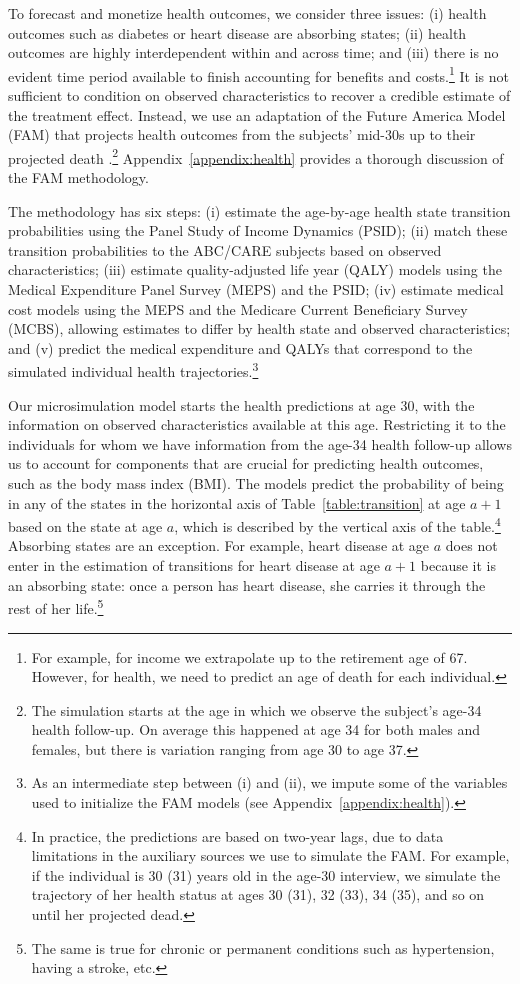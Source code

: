To forecast and monetize health outcomes, we consider three issues: (i) health outcomes such as diabetes or heart disease are absorbing states; (ii) health outcomes are highly interdependent within and across time; and (iii) there is no evident time period available to finish accounting for benefits and costs.\footnote{For example, for income we extrapolate up to the retirement age of 67. However, for health, we need to predict an age of death for each individual.} It is not sufficient to condition on observed characteristics to recover a credible estimate of the treatment effect. Instead, we use an adaptation of the Future America Model (FAM) that projects health outcomes from the subjects' mid-30s up to their projected death \citep{Goldman_etal_2015_Future-Elderly-Model-Report}.\footnote{The simulation starts at the age in which we observe the subject's age-34 health follow-up. On average this happened at age 34 for both males and females, but there is variation ranging from age 30 to age 37.} Appendix~\ref{appendix:health} provides a thorough discussion of the FAM methodology.

 The methodology has six steps: (i) estimate the age-by-age health state transition probabilities using the Panel Study of Income Dynamics (PSID); (ii) match these transition probabilities to the ABC/CARE subjects based on observed characteristics; (iii) estimate quality-adjusted life year (QALY) models using the Medical Expenditure Panel Survey (MEPS) and the PSID; (iv) estimate medical cost models using the MEPS and the Medicare Current Beneficiary Survey (MCBS), allowing estimates to differ by health state and observed characteristics; and (v) predict the medical expenditure and QALYs that correspond to the simulated individual health trajectories.\footnote{As an intermediate step between (i) and (ii), we impute some of the variables used to initialize the FAM models (see Appendix~\ref{appendix:health}).}

Our microsimulation model starts the health predictions at age 30, with the information on observed characteristics available at this age. Restricting it to the individuals for whom we have information from the age-34 health follow-up allows us to account for components that are crucial for predicting health outcomes, such as the body mass index (BMI). The models predict the probability of being in any of the states in the horizontal axis of Table~\ref{table:transition} at age $a+1$ based on the state at age $a$, which is described by the vertical axis of the table.\footnote{In practice, the predictions are based on two-year lags, due to data limitations in the auxiliary sources we use to simulate the FAM. For example, if the individual is 30 (31) years old in the age-30 interview, we simulate the trajectory of her health status at ages 30 (31), 32 (33), 34 (35), and so on until her projected dead.} Absorbing states are an exception. For example, heart disease at age $a$ does not enter in the estimation of transitions for heart disease at age $a+1$ because it is an absorbing state: once a person has heart disease, she carries it through the rest of her life.\footnote{The same is true for chronic or permanent conditions such as hypertension, having a stroke, etc.}

